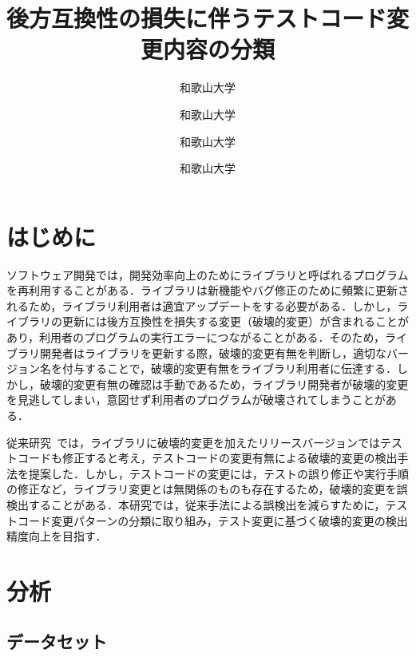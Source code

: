 \documentclass[uplatex,dvipdfmx,a4paper,twocolumn,base=11pt,jbase=11pt,ja=standard]{bxjsarticle}  %
\title{後方互換性の損失に伴うテストコード変更内容の分類}{A classification of test code changes accompanied by a lack of backward compatibility}
\author{和歌山大学}{前川　大樹}{Daiki Maekawa, Wakayama University}
\author{和歌山大学}{伊原　彰紀}{Akinori Ihara, Wakayama University}
\author{和歌山大学}{大森　楓己}{Fuki Omori, Wakayama University}
\author{和歌山大学}{才木　一也}{Kazuya Saiki, Wakayama University}
\begin{document}
\maketitle

\section{はじめに}

ソフトウェア開発では，開発効率向上のためにライブラリと呼ばれるプログラムを再利用することがある．ライブラリは新機能やバグ修正のために頻繁に更新されるため，ライブラリ利用者は適宜アップデートをする必要がある．しかし，ライブラリの更新には後方互換性を損失する変更（破壊的変更）が含まれることがあり，利用者のプログラムの実行エラーにつながることがある．そのため，ライブラリ開発者はライブラリを更新する際，破壊的変更有無を判断し，適切なバージョン名を付与することで，破壊的変更有無をライブラリ利用者に伝達する．しかし，破壊的変更有無の確認は手動であるため，ライブラリ開発者が破壊的変更を見逃してしまい，意図せず利用者のプログラムが破壊されてしまうことがある．

従来研究~\cite{FOSE2021_Matsuda}では，ライブラリに破壊的変更を加えたリリースバージョンではテストコードも修正すると考え，テストコードの変更有無による破壊的変更の検出手法を提案した．しかし，テストコードの変更には，テストの誤り修正や実行手順の修正など，ライブラリ変更とは無関係のものも存在するため，破壊的変更を誤検出することがある．本研究では，従来手法による誤検出を減らすために，テストコード変更パターンの分類に取り組み，テスト変更に基づく破壊的変更の検出精度向上を目指す．

\section{分析}
\subsection{データセット}
\end{document}

